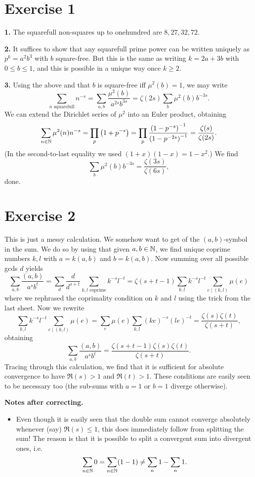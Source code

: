 \documentclass[a4paper,11pt]{article}
\begin{document}
\section*{Exercise 1}
\textbf{1.} The squarefull non-squares up to onehundred are $8,27,32,72$.

\textbf{2.} It suffices to show that any squarefull prime power can be written uniquely as
$p^k = a^2 b^3$ with $b$ square-free. But this is the same as writing $k =
2a+3b$ with $0 \leq b \leq 1$, and this is possible in a unique way once $k \geq 2$. 

\textbf{3.} Using the above and that $b$ is square-free iff $\mu^2(b) = 1$, we may write
\[
    \sum_{n \text{ squarefull}} n^{-s} = \sum_{a,b} \frac{\mu^2(b)}{a^{2s} b^{3s}} = \zeta(2s) \sum_{b} \mu^2(b) b^{-3s}.
\]
We can extend the Dirichlet series of $\mu^2$ into an Euler product, obtaining
\[
    \sum_{n \in \mathbb{N}} \mu^2(n)n^{-s} = \prod_p \left(1 + p^{-s} \right) = \prod_p
    \frac {\left(1 - p^{-s}\right)^{-1}} {\left(1 - p^{-2s}\right)^{-1}} =
    \frac {\zeta(s)}{\zeta(2s)}.
\]
(In the second-to-last equality we used $(1+x)(1-x) = 1-x^2$.)
We find 
\[
    \sum_{b} \mu^2(b) b^{-3s} = \frac{\zeta(3s) }{\zeta(6s)},
\]
done.

\section*{Exercise 2}
This is just a messy calculation. 
We somehow want to get of the $(a,b)$-symbol in the sum. We do so by using that
given $a,b \in \mathbb{N}$, we find unique coprime numbers $k, l$ with $a = k (a,b)$ and 
$b = k (a,b)$. Now summing over all possible gcds $d$ yields
\[
    \sum_{a,b} \frac{(a,b)}{a^s b^t} = \sum_{d} \frac d{d^{s+t}} \sum_{k,l
    \text{ coprime}} k^{-s}l^{-t} = \zeta(s+t-1)\sum_{k,l} k^{-s}l^{-t} \sum_{e \mid (k,l)} \mu(e)
\]
where we rephrased the coprimality condition on $k$ and $l$ using the trick
from the last sheet.
Now we rewrite
\[
    \sum_{k,l} k^{-s}l^{-t} \sum_{e \mid (k,l)} \mu(e) = \sum_e \mu(e)
    \sum_{k,l} (ke)^{-s} (le)^{-t} = \frac{\zeta(s)\zeta(t)}{\zeta(s+t)},
\]
obtaining
\[
    \sum_{a,b} \frac{(a,b)}{a^s b^t} = \frac {\zeta(s+t-1) \zeta(s) \zeta(t)}{\zeta(s+t)}.
\]
Tracing through this calculation, we find that it is sufficient for absolute convergence to have
$\Re(s)>1$ and $\Re(t) > 1$. These conditions are easily seen to be necessary too (the sub-sums with 
$a=1$ or $b=1$ diverge otherwise).

\textbf{Notes after correcting.} \leavevmode
\begin{itemize}
    \item Even though it is easily seen that the double sum cannot converge
        absolutely whenever (say) $\Re(s) \leq 1$, this does immediately follow from splitting 
        the sum! The reason is that it is possible to split a convergent sum into divergent 
        ones, i.e.
        \[
            \sum_{n \in \mathbb{N}} 0 = \sum_{n \in \mathbb{N}} (1-1) \neq \sum_n 1 - \sum_n 1.
        \]
\end{itemize}
\end{document}
